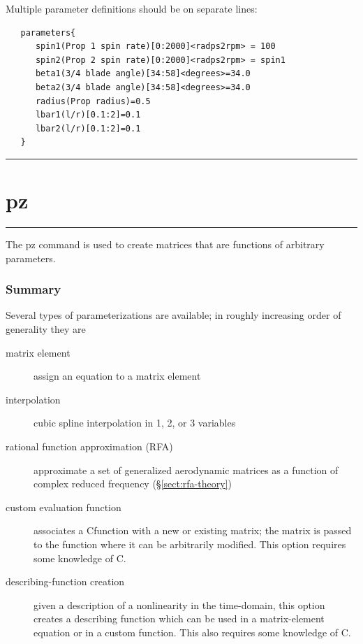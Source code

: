 \documentclass[11pt,openany,twoside]{book}
\makeatletter
\numberwithin{equation}{section}		%
\def\Cpp{{C\nolinebreak[4]\hspace{-.05em}\raisebox{.4ex}{\tiny\bf ++}}\:}
\newcommand{\Cmd}[1]{{\sf #1}}
\newcommand{\Manpg}[1]{
	\hspace{-\parindent}\rule[-5mm]{\textwidth}{0.3mm}
	\newpage
	\section[\Cmd{#1}]{\sf\Large{#1}} \label{ref:#1} \index{#1@\Cmd{#1}!reference}
	\rule[5mm]{\textwidth}{0.3mm}
}
\newcommand{\Sectref}[1]{\S\ref{#1}}
\makeatother
\begin{document}
Multiple parameter definitions should be on separate lines:
\begin{lstlisting}
   parameters{
      spin1(Prop 1 spin rate)[0:2000]<radps2rpm> = 100
      spin2(Prop 2 spin rate)[0:2000]<radps2rpm> = spin1
      beta1(3/4 blade angle)[34:58]<degrees>=34.0
      beta2(3/4 blade angle)[34:58]<degrees>=34.0
      radius(Prop radius)=0.5
      lbar1(l/r)[0.1:2]=0.1
      lbar2(l/r)[0.1:2]=0.1
   }
\end{lstlisting}

\Manpg{pz}

The \Cmd{pz} command is used to create matrices
that are functions of arbitrary parameters.

\subsubsection{Summary}
Several types of parameterizations are available; in roughly increasing
order of generality they are

\begin{description}
\item[matrix element]
   assign an equation to a matrix element
        
\item[interpolation]
   cubic spline interpolation in 1, 2, or 3 variables

\item[rational function approximation (RFA)]
   approximate a set of generalized aerodynamic matrices
   as a function of complex reduced frequency (\Sectref{sect:rfa-theory})
                        
\item[custom evaluation function]
   associates a \Cpp function with a new or existing matrix; the
   matrix is passed to the function where it can be arbitrarily modified.
   This option requires some knowledge of \Cpp.

\item[describing-function creation]
   given a description of a nonlinearity in the time-domain,
   this option creates a describing function which can be used in
   a matrix-element equation or in a custom function. This also
   requires some knowledge of \Cpp.
                
\end{description}
\end{document}
